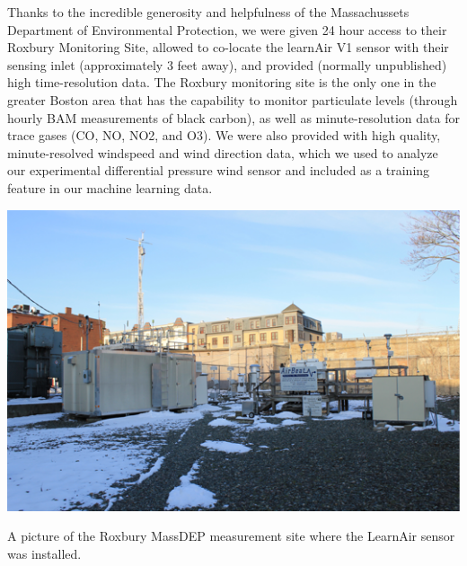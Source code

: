 Thanks to the incredible generosity and helpfulness of the Massachussets Department of Environmental Protection, we were given 24 hour access to their Roxbury Monitoring Site, allowed to co-locate the learnAir V1 sensor with their sensing inlet (approximately 3 feet away), and provided (normally unpublished) high time-resolution data.  The Roxbury monitoring site is the only one in the greater Boston area that has the capability to monitor particulate levels (through hourly BAM measurements of black carbon), as well as minute-resolution data for trace gases (CO, NO, NO2, and O3).  We were also provided with high quality, minute-resolved windspeed and wind direction data, which we used to analyze our experimental differential pressure wind sensor and included as a training feature in our machine learning data.      

\begin{marginfigure}[3.5cm]
 	\includegraphics[width=\textwidth]{visuals/epa}               
 	 \caption{A picture of the Roxbury MassDEP measurement site where the LearnAir sensor was installed.}
  	\label{fig:epa}
\end{marginfigure}

